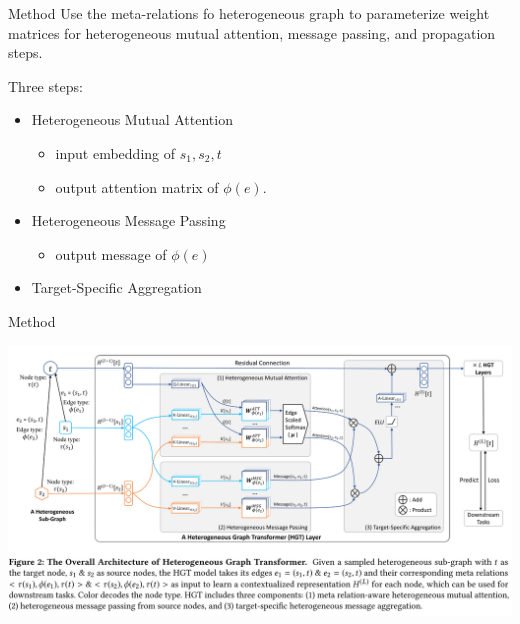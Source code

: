 \documentclass[aspectratio=1610,hyperref={colorlinks,unicode,linkcolor=blue,anchorcolor=blue,citecolor=blue,filecolor=black,urlcolor=blue}]{beamer}
\begin{document}
\begin{frame}[label={sec:orgab989de}]{Method}
Use the \alert{meta-relations} fo heterogeneous graph to parameterize weight
matrices for heterogeneous mutual attention, message passing, and
propagation steps.

Three steps:

\begin{itemize}
\item Heterogeneous Mutual Attention
\begin{itemize}
\item input embedding of \(s_1,s_2,t\)
\item output attention matrix of \(\phi(e)\).
\end{itemize}
\item Heterogeneous Message Passing
\begin{itemize}
\item output message of \(\phi(e)\)
\end{itemize}
\item Target-Specific Aggregation
\end{itemize}
\end{frame}

\begin{frame}[label={sec:org4af6efc}]{Method}
\begin{center}
\includegraphics[width=.9\linewidth]{./p2.png}
\end{center}
\end{frame}
\end{document}

